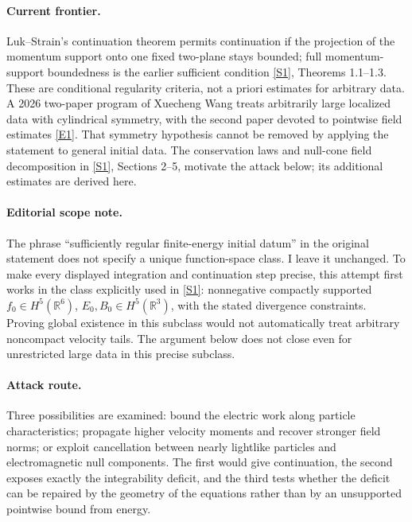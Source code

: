 \documentclass[11pt,a4paper]{article}
\newcommand{\R}{\mathbb{R}}
\newcommand{\sref}[2]{\hyperlink{source:#1:#2}{[S#2]}}
\newcommand{\eref}[2]{\hyperlink{extra:#1:#2}{[E#2]}}
\begin{document}
\paragraph{Current frontier.}
Luk--Strain's continuation theorem permits continuation if the projection
of the momentum support onto one fixed two-plane stays bounded; full
momentum-support boundedness is the earlier sufficient condition
\sref{statement}{1}, Theorems 1.1--1.3. These are conditional regularity criteria,
not a priori estimates for arbitrary data. A 2026 two-paper program of
Xuecheng Wang treats arbitrarily large localized data with cylindrical
symmetry, with the second paper devoted to pointwise field estimates
\eref{statement}{1}. That symmetry hypothesis cannot be removed by applying the
statement to general initial data. The conservation laws and null-cone
field decomposition in \sref{statement}{1}, Sections 2--5, motivate the attack
below; its additional estimates are derived here.

\paragraph{Editorial scope note.}
The phrase ``sufficiently regular finite-energy initial datum'' in the
original statement does not specify a unique function-space class. I leave
it unchanged. To make every displayed integration and continuation step
precise, this attempt first works in the class explicitly used in
\sref{statement}{1}: nonnegative compactly supported $f_0\in H^5(\R^6)$,
$E_0,B_0\in H^5(\R^3)$, with the stated divergence constraints. Proving
global existence in this subclass would not automatically treat arbitrary
noncompact velocity tails. The argument below does not close even for
unrestricted large data in this precise subclass.

\paragraph{Attack route.}
Three possibilities are examined: bound the electric work along particle
characteristics; propagate higher velocity moments and recover stronger
field norms; or exploit cancellation between nearly lightlike particles
and electromagnetic null components. The first would give continuation,
the second exposes exactly the integrability deficit, and the third tests
whether the deficit can be repaired by the geometry of the equations rather
than by an unsupported pointwise bound from energy.
\end{document}
